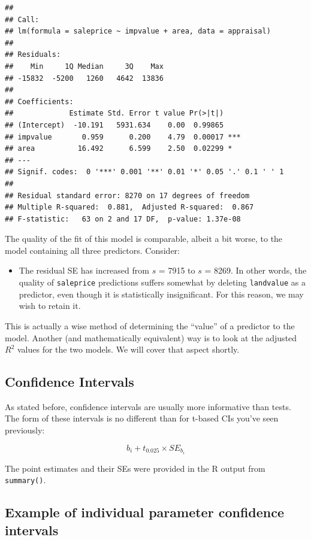\documentclass[
]{book}
\providecommand{\tightlist}{%
  \setlength{\itemsep}{0pt}\setlength{\parskip}{0pt}}
\begin{document}
\begin{verbatim}
## 
## Call:
## lm(formula = saleprice ~ impvalue + area, data = appraisal)
## 
## Residuals:
##    Min     1Q Median     3Q    Max 
## -15832  -5200   1260   4642  13836 
## 
## Coefficients:
##             Estimate Std. Error t value Pr(>|t|)    
## (Intercept)  -10.191   5931.634    0.00  0.99865    
## impvalue       0.959      0.200    4.79  0.00017 ***
## area          16.492      6.599    2.50  0.02299 *  
## ---
## Signif. codes:  0 '***' 0.001 '**' 0.01 '*' 0.05 '.' 0.1 ' ' 1
## 
## Residual standard error: 8270 on 17 degrees of freedom
## Multiple R-squared:  0.881,  Adjusted R-squared:  0.867 
## F-statistic:   63 on 2 and 17 DF,  p-value: 1.37e-08
\end{verbatim}

The quality of the fit of this model is comparable, albeit a bit worse, to the model containing all three predictors.
Consider:

\begin{itemize}
\tightlist
\item
  The residual SE has increased from \(s\) = 7915 to \(s\) = 8269. In other words, the quality of \texttt{saleprice} predictions suffers somewhat by deleting \texttt{landvalue} as a predictor, even though it is statistically insignificant. For this reason, we may wish to retain it.
\end{itemize}

This is actually a wise method of determining the ``value'' of a predictor to the model.
Another (and mathematically equivalent) way is to look at the adjusted \(R^2\) values for the two models.
We will cover that aspect shortly.

\hypertarget{confidence-intervals}{%
\subsection{Confidence Intervals}\label{confidence-intervals}}

As stated before, confidence intervals are usually more informative than tests. The form of these intervals is no different than for t-based CIs you've seen previously:

\[b_i + t_{0.025}\times SE_{b_i}\]

The point estimates and their SEs were provided in the R output from \texttt{summary()}.

\hypertarget{example-of-individual-parameter-confidence-intervals}{%
\subsection{Example of individual parameter confidence intervals}\label{example-of-individual-parameter-confidence-intervals}}
\end{document}
